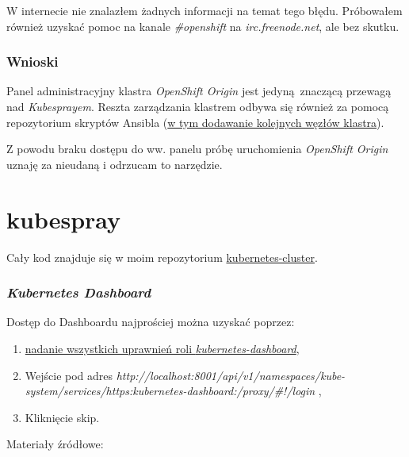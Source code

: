 \documentclass[a4paper,12pt,twoside,openany]{report}
\providecommand{\tightlist}{%
  \setlength{\itemsep}{0pt}\setlength{\parskip}{0pt}}
\begin{document}
W internecie nie znalazłem żadnych informacji na temat tego błędu.
Próbowałem również uzyskać pomoc na kanale \emph{\#openshift} na
\emph{irc.freenode.net}, ale bez skutku.

\hypertarget{wnioski-3}{%
\subsubsection{Wnioski}\label{wnioski-3}}

Panel administracyjny klastra \emph{OpenShift Origin} jest
jedyną~znaczącą przewagą nad \emph{Kubesprayem}. Reszta zarządzania
klastrem odbywa się również za pomocą repozytorium skryptów Ansibla
(\href{https://docs.openshift.com/enterprise/3.0/admin_guide/manage_nodes.html\#adding-nodes}{w
tym dodawanie kolejnych węzłów klastra}).

Z powodu braku dostępu do ww. panelu próbę uruchomienia \emph{OpenShift
Origin} uznaję za nieudaną i odrzucam to narzędzie.

\hypertarget{kubespray-1}{%
\section{kubespray}\label{kubespray-1}}

Cały kod znajduje się w moim repozytorium
\href{https://github.com/nazarewk/kubernetes-cluster}{kubernetes-cluster}.

\hypertarget{kubernetes-dashboard-1}{%
\subsubsection{\texorpdfstring{\emph{Kubernetes
Dashboard}}{Kubernetes Dashboard}}\label{kubernetes-dashboard-1}}

Dostęp do Dashboardu najprościej można uzyskać poprzez:

\begin{enumerate}
\def\labelenumi{\arabic{enumi}.}
\tightlist
\item
  \href{https://github.com/kubernetes/dashboard/wiki/Access-control\#admin-privileges}{nadanie
  wszystkich uprawnień roli \emph{kubernetes-dashboard}},
\item
  Wejście pod adres
  \emph{http://localhost:8001/api/v1/namespaces/kube-system/services/https:kubernetes-dashboard:/proxy/\#!/login}
  ,
\item
  Kliknięcie skip.
\end{enumerate}

Materiały źródłowe:
\end{document}
